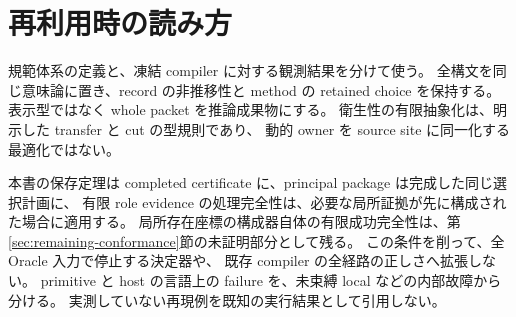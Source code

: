 \documentclass[11pt,a4paper]{article}
\theoremstyle{remark}
\begin{document}
\section{再利用時の読み方}

規範体系の定義と、凍結 compiler に対する観測結果を分けて使う。
全構文を同じ意味論に置き、record の非推移性と method の retained choice を保持する。
表示型ではなく whole packet を推論成果物にする。
衛生性の有限抽象化は、明示した transfer と cut の型規則であり、
動的 owner を source site に同一化する最適化ではない。

本書の保存定理は completed certificate に、principal package は完成した同じ選択計画に、
有限 role evidence の処理完全性は、必要な局所証拠が先に構成された場合に適用する。
局所存在座標の構成器自体の有限成功完全性は、第\ref{sec:remaining-conformance}節の未証明部分として残る。
この条件を削って、全 Oracle 入力で停止する決定器や、
既存 compiler の全経路の正しさへ拡張しない。
primitive と host の言語上の failure を、未束縛 local などの内部故障から分ける。
実測していない再現例を既知の実行結果として引用しない。
\end{document}
